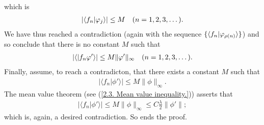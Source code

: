 %
which is %
%
  \begin{align}
    \lvert
      \langle{f_n}\lvert{\varphi_j}\rangle
    \rvert 
      \leq 
    M 
    \quad (n=1, 2, 3, \dots).
  \end{align}
%
We have thus reached a contradiction (again with the sequence %
%
  $\{\langle f_n\lvert \varphi_{\rho(n)} \rangle\}$) %
%
and so conclude that there is no constant $M$ such that %
%
  \begin{align}
    \lvert 
      \langle \lvert f_n \varphi'\rangle
    \rvert 
      \leq 
    M \| \varphi' \|_\infty
    \quad (n=1, 2, 3, \dots).
  \end{align}
%
Finally, assume, to reach a contradicton, that %
there exists a constant $M$ such that 
%
  \begin{align}
    \lvert \langle f_n \lvert \phi' \rangle \rvert 
      \leq 
    M \| \phi \|_\infty.
  \end{align}
%
The mean value theorem (see (\ref{2.3. Mean value inequality.})) asserts that %
%
  \begin{align}
    \lvert \langle f_n \lvert \phi' \rangle \rvert 
      \leq 
    M \| \phi \|_\infty \leq C \frac{\lambda}{2}\| \phi' \|; 
  \end{align}
%
which is, again, a desired contradiction. So ends the proof.


